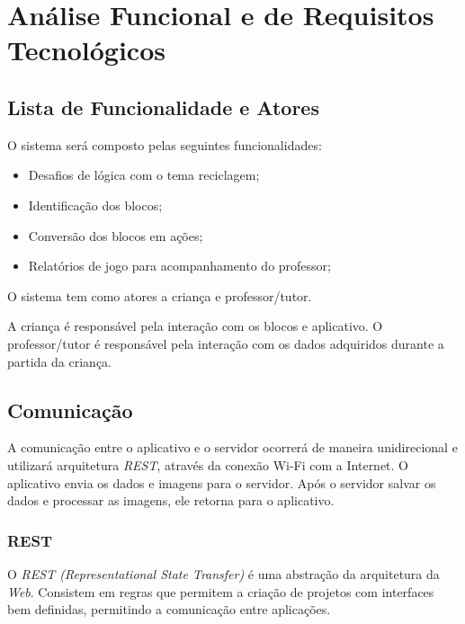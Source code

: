 \section{Análise Funcional e de Requisitos Tecnológicos}

    \subsection{Lista de Funcionalidade e Atores}
    O sistema será composto  pelas seguintes funcionalidades:
    \begin{itemize}
        \item Desafios de lógica com o tema reciclagem;
        \item Identificação dos blocos;
        \item Conversão dos blocos em ações;
        \item Relatórios de jogo para acompanhamento do professor;
    \end{itemize}
    
    O sistema tem como atores a criança e professor/tutor.
    
    A criança é responsável pela interação com os blocos e aplicativo.
    O professor/tutor é responsável pela interação com os dados adquiridos durante a partida da criança.
    
    \subsection{Comunicação}
    A comunicação entre o aplicativo e o servidor ocorrerá de maneira unidirecional e utilizará arquitetura \textit{REST}, através da conexão Wi-Fi com a Internet.
    O aplicativo envia os dados e imagens para o servidor. Após o servidor salvar os dados e processar as imagens, ele retorna para o aplicativo.
    
        \subsubsection{REST}
        O \textit{REST (Representational State Transfer)} é uma abstração da arquitetura da \textit{Web}. Consistem em regras que permitem a criação de projetos com interfaces bem definidas, permitindo a comunicação entre aplicações.
    
    
    
